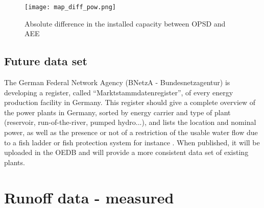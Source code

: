 \begin{figure}[H]
\centering
\texttt{[image: map\_diff\_pow.png]}
\caption[Absolute difference in the installed capacity between OPSD and AEE]{Absolute difference in the installed capacity between OPSD and AEE}
\label{map_diff_pow}
\end{figure}


\subsection{Future data set}

The German Federal Network Agency (BNetzA - Bundesnetzagentur) is developing a register, called ``Marktstammdatenregister'', of every energy production facility in Germany. This register should give a complete overview of the power plants in Germany, sorted by energy carrier and type of plant (reservoir, run-of-the-river, pumped hydro...), and lists the location and nominal power, as well as the presence or not of a restriction of the usable water flow due to a fish ladder or fish protection system for instance \cite{MaStR}. \newline
When published, it will be uploaded in the OEDB and will provide a more consistent data set of existing plants.

\section{Runoff data - measured}

\label{sec:meas_runoff}

